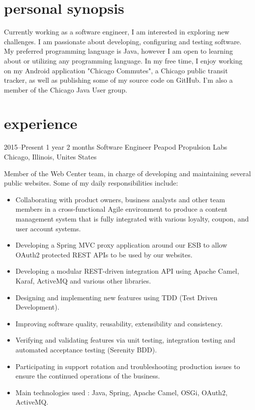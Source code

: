 \documentclass[]{friggeri-cv} %
\begin{document}
\section{personal synopsis}

Currently working as a software engineer, I am interested in exploring new challenges. I am passionate about developing, configuring and testing software. My preferred programming language is Java, however I am open to learning about or utilizing any programming language. In my free time, I enjoy working on my Android application "Chicago Commutes", a Chicago public transit tracker, as well as publishing some of my source code on GitHub. I'm also a member of the Chicago Java User group.



\section{experience}


\begin{entrylist}

\entry
{2015--Present}
{1 year 2 months}
{Software Engineer} 
{Peapod Propulsion Labs}
{Chicago, Illinois, Unites States}
{Member of the Web Center team, in charge of developing and maintaining several public websites. Some of my daily responsibilities include:\\
\vspace{-4mm}
\begin{itemize}
	\item Collaborating with product owners, business analysts and other team members in a cross-functional Agile environment to produce a content management system that is fully integrated with various loyalty, coupon, and user account systems.
		\item Developing a Spring MVC proxy application around our ESB to allow OAuth2 protected REST APIs to be used by our websites.
	\item Developing a modular REST-driven integration API using Apache Camel, Karaf, ActiveMQ and various other libraries.
	\item Designing and implementing new features using TDD (Test Driven Development).
	\item Improving software quality, reusability, extensibility and consistency.
	\item Verifying and validating features via unit testing, integration testing and automated acceptance testing (Serenity BDD).
	\item Participating in support rotation and troubleshooting production issues to ensure the continued operations of the business.
	\item Main technologies used : Java, Spring, Apache Camel, OSGi, OAuth2, ActiveMQ.
\end{itemize}
}
\vspace{-7mm}

\end{entrylist}
\end{document}
